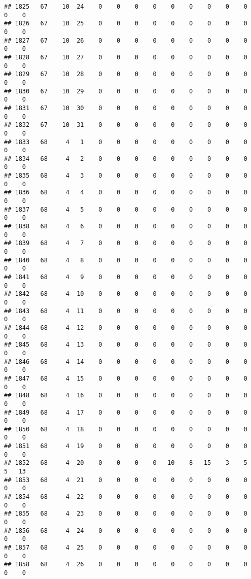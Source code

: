 \documentclass[]{article}
\begin{document}
\begin{verbatim}
## 1825   67    10  24    0    0    0    0    0    0    0    0    0    0    0
## 1826   67    10  25    0    0    0    0    0    0    0    0    0    0    0
## 1827   67    10  26    0    0    0    0    0    0    0    0    0    0    0
## 1828   67    10  27    0    0    0    0    0    0    0    0    0    0    0
## 1829   67    10  28    0    0    0    0    0    0    0    0    0    0    0
## 1830   67    10  29    0    0    0    0    0    0    0    0    0    0    0
## 1831   67    10  30    0    0    0    0    0    0    0    0    0    0    0
## 1832   67    10  31    0    0    0    0    0    0    0    0    0    0    0
## 1833   68     4   1    0    0    0    0    0    0    0    0    0    0    0
## 1834   68     4   2    0    0    0    0    0    0    0    0    0    0    0
## 1835   68     4   3    0    0    0    0    0    0    0    0    0    0    0
## 1836   68     4   4    0    0    0    0    0    0    0    0    0    0    0
## 1837   68     4   5    0    0    0    0    0    0    0    0    0    0    0
## 1838   68     4   6    0    0    0    0    0    0    0    0    0    0    0
## 1839   68     4   7    0    0    0    0    0    0    0    0    0    0    0
## 1840   68     4   8    0    0    0    0    0    0    0    0    0    0    0
## 1841   68     4   9    0    0    0    0    0    0    0    0    0    0    0
## 1842   68     4  10    0    0    0    0    0    0    0    0    0    0    0
## 1843   68     4  11    0    0    0    0    0    0    0    0    0    0    0
## 1844   68     4  12    0    0    0    0    0    0    0    0    0    0    0
## 1845   68     4  13    0    0    0    0    0    0    0    0    0    0    0
## 1846   68     4  14    0    0    0    0    0    0    0    0    0    0    0
## 1847   68     4  15    0    0    0    0    0    0    0    0    0    0    0
## 1848   68     4  16    0    0    0    0    0    0    0    0    0    0    0
## 1849   68     4  17    0    0    0    0    0    0    0    0    0    0    0
## 1850   68     4  18    0    0    0    0    0    0    0    0    0    0    0
## 1851   68     4  19    0    0    0    0    0    0    0    0    0    0    0
## 1852   68     4  20    0    0    0    0   10    8   15    3    5    5   13
## 1853   68     4  21    0    0    0    0    0    0    0    0    0    0    0
## 1854   68     4  22    0    0    0    0    0    0    0    0    0    0    0
## 1855   68     4  23    0    0    0    0    0    0    0    0    0    0    0
## 1856   68     4  24    0    0    0    0    0    0    0    0    0    0    0
## 1857   68     4  25    0    0    0    0    0    0    0    0    0    0    0
## 1858   68     4  26    0    0    0    0    0    0    0    0    0    0    0

\end{verbatim}
\end{document}
